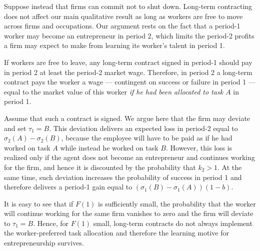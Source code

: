 \documentclass[12pt,american]{paper}
\theoremstyle{remark}
\begin{document}
Suppose instead that firms can commit not to shut down. Long-term contracting does not affect our main qualitative result  as long as workers are free to move across firms and occupations.  Our argument rests on the fact that a period-1 worker may become an entrepreneur in period 2, which limits the period-2 profits a firm may expect to make from learning its worker's talent in period 1. 

If workers are free to leave, any long-term contract signed in period-1 should pay in period 2 at least the period-2 market wage. Therefore, in period 2 a long-term contract pays the worker  a wage --- contingent on success or failure in period 1 --- equal to the market value of this worker \emph{if he had been allocated to task $A$} in period 1. 


Assume that such a contract is signed. We argue here that the firm may deviate and set $\tau_1=B$. This deviation delivers an expected loss in period-2 equal to $\sigma_2(A)-\sigma_2(B)$, because the employee will have to be paid as if he had worked on task $A$ while instead he worked on task $B$. However, this loss is realized only if the agent does not become an entrepreneur and continues working for the firm, and hence it is discounted by the probability that $k_2>1$. At the same time, such deviation increases the probability of success in period 1 and therefore delivers a period-1 gain equal to $(\sigma_1(B)-\sigma_1(A))(1-b)$. 

It is easy to see that if $F(1)$ is sufficiently small, the probability that the worker will continue working for the same firm vanishes to zero and the firm will deviate to  $\tau_1=B$. Hence, for $F(1)$ small, long-term contracts do not always implement the worker-preferred task allocation and therefore the learning motive for entrepreneurship survives.

{}

\end{document}

